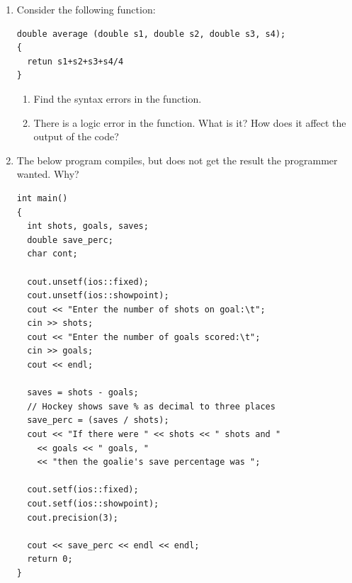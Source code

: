 \begin{enumerate}
	\item Consider the following function:
	
\noindent\begin{minipage}{\linewidth}\begin{lstlisting}
double average (double s1, double s2, double s3, s4);
{
  retun s1+s2+s3+s4/4
}
\end{lstlisting}\end{minipage}

		\begin{enumerate}
		\item Find the syntax errors in the function.
		\item There is a logic error in the function. What is it? How does it affect the output of the code?
		\end{enumerate}

  \item The below program compiles, but does not get the result the programmer wanted. Why? \nopagebreak[4]

\noindent\begin{minipage}{\linewidth}\begin{lstlisting}
int main()
{
  int shots, goals, saves;
  double save_perc;
  char cont;

  cout.unsetf(ios::fixed);
  cout.unsetf(ios::showpoint);
  cout << "Enter the number of shots on goal:\t";
  cin >> shots;
  cout << "Enter the number of goals scored:\t";
  cin >> goals;
  cout << endl;

  saves = shots - goals;
  // Hockey shows save % as decimal to three places
  save_perc = (saves / shots); 
  cout << "If there were " << shots << " shots and " 
    << goals << " goals, " 
    << "then the goalie's save percentage was ";

  cout.setf(ios::fixed);
  cout.setf(ios::showpoint);
  cout.precision(3);
  
  cout << save_perc << endl << endl;
  return 0;
}
\end{lstlisting}\end{minipage}


\end{enumerate}



